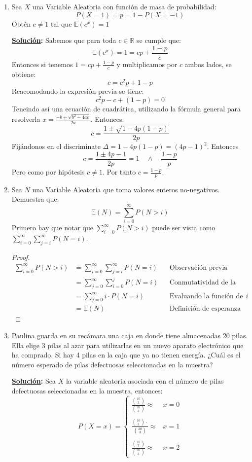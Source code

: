 \documentclass[11pt,letterpaper]{report}
\newcommand{\R}{\mathbb{R}}
\newcommand{\sol}{\textbf{\underline{Solución}: }} %
\begin{document}
\begin{enumerate}
\sol 

\item Sea $X$ una Variable Aleatoria con función de masa de probabilidad: 
\[
    P(X = 1) = p = 1 - P(X = -1)
\]
Obtén $c \not= 1$ tal que $\mathds{E}(c^x)=1$

\sol Sabemos que para toda $c \in \R$ se cumple que:
$$  \mathds{E}(c^x) = 1 = cp + \frac{1-p}{c}    $$
Entonces si tenemos $1 = cp + \frac{1-p}{c}$ y multiplicamos por $c$ ambos lados, se obtiene:
\[
    c = c^2p + 1-p
\]
Reacomodando la expresión previa se tiene:
\[
    c^2p - c + (1-p) = 0
\]
Teneindo así una ecuación de cuadrática, utilizando la fórmula general para resolverla
$   x = \frac{-b \pm \sqrt{b^2 - 4ac}}{2a}  $. Entonces:
\[
    c = \frac{1 \pm \sqrt{1 - 4p(1-p)}}{2p}
\]
Fijándonos en el discriminate $\Delta = 1 - 4p(1-p) = (4p-1)^2$. Entonces
\[
    c = \frac{1 \pm 4p-1}{2p} = 1 \quad \land \quad \frac{1-p}{p}
\]
Pero como por hipótesis $c \not= 1$. Por tanto $c = \frac{1-p}{p}$.


\item Sea $N$ una Variable Aleatoria que toma valores enteros no-negativos. Demuestra que:
\[
    \mathds{E}(N) = \sum_{i=0}^{\infty} P(N > i)
\]
Primero hay que notar que $\sum_{i=0}^{\infty} P(N > i)$ puede ser vista como
$\sum_{i=0}^{\infty} \sum_{j=i}^{\infty} P(N = i)$.
\begin{proof}
    \begin{align*}
        \sum_{i=0}^{\infty} P(N > i)
            &= \sum_{i=0}^{\infty} \sum_{j=i}^{\infty} P(N = i) && \text{Observación previa}\\
            &= \sum_{j=0}^{\infty} \sum_{i=0}^{j} P(N = i) && \text{Conmutatividad de la suma}\\
            &= \sum_{j=0}^{\infty} i \cdot P(N = i) && \text{Evaluando la función de probabilidad en $i$}\\
            &= \mathds{E}(N) && \text{Definición de esperanza}
    \end{align*}
\end{proof}

\item Paulina guarda en su recámara una caja en donde tiene almacenadas 20 pilas. Ella elige 3 pilas
al azar para utilizarlas en un nuevo aparato electrónico que ha comprado. Si hay 4 pilas en la caja
que ya no tienen energía. ¿Cuál es el número esperado de pilas defectuosas seleccionadas en la muestra?

\sol Sea $X$ la variable aleatoria asociada con el número de pilas defectuosas seleccionadas en
la muestra, entonces:
\[
    P(X=x) =
        \begin{cases}
            \frac{\binom{16}{3}}{\binom{20}{3}} \approx & x=0\\\\
            \frac{\binom{16}{3} \cdot }{\binom{20}{3}} \approx & x=1\\\\
            \frac{\binom{16}{3}}{\binom{20}{3}} \approx & x=2
        \end{cases}
\]


\end{enumerate}
\end{document}
